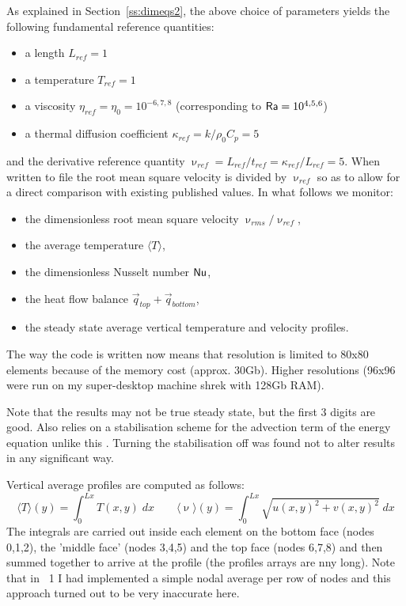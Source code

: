 As explained in Section~\ref{ss:dimeqs2}, the above choice of parameters yields the following 
fundamental reference quantities:
\begin{itemize}
\item a length $L_{ref}=1$ 
\item a temperature $T_{ref}=1$ 
\item a viscosity $\eta_{ref}=\eta_0=10^{-6,7,8}$ (corresponding to ${\mathsf{Ra}}=10^{4,5,6}$) 
\item a thermal diffusion coefficient $\kappa_{ref}=k/\rho_0 C_p = 5$ 
\end{itemize}
and the derivative reference quantity $\upnu_{ref} = L_{ref} / t_{ref} = \kappa_{ref}/L_{ref} = 5$.
When written to file the root mean square velocity is divided by $\upnu_{ref}$ so as to allow
for a direct comparison with existing published values.
In what follows we monitor:
\begin{itemize}
\item the dimensionless root mean square velocity $\upnu_{rms}/\upnu_{ref}$,
\item the average temperature $\langle T \rangle$,
\item the dimensionless Nusselt number ${\mathsf{Nu}}$,
\item the heat flow balance $\vec{q}_{top}+\vec{q}_{bottom}$,
\item the steady state average vertical temperature and velocity profiles.
\end{itemize}

The way the code is written now means that resolution is limited to 80x80 elements 
because of the memory cost (approx. 30Gb). Higher resolutions (96x96 were run on my 
super-desktop machine shrek with 128Gb RAM).

Note that the \aspect results may not be true steady state, but the first 3 digits are good.
Also \aspect relies on a stabilisation scheme for the advection term of the energy equation
unlike this \stone. Turning the stabilisation off was found not to alter results in any 
significant way.

Vertical average profiles are computed as follows:
\[
\langle T \rangle (y) = \int_0^{Lx} T(x,y) \; dx 
\qquad
\langle \upnu \rangle (y) = \int_0^{Lx} \sqrt{u(x,y)^2+v(x,y)^2} \; dx 
\]
The integrals are carried out inside each element on the bottom face (nodes 0,1,2),
the 'middle face' (nodes 3,4,5) and the top face (nodes 6,7,8) and then summed together
to arrive at the profile (the profiles arrays are nny long). 
Note that in \stone~1 I had implemented a simple nodal average
per row of nodes and this approach turned out to be very inaccurate here.   


